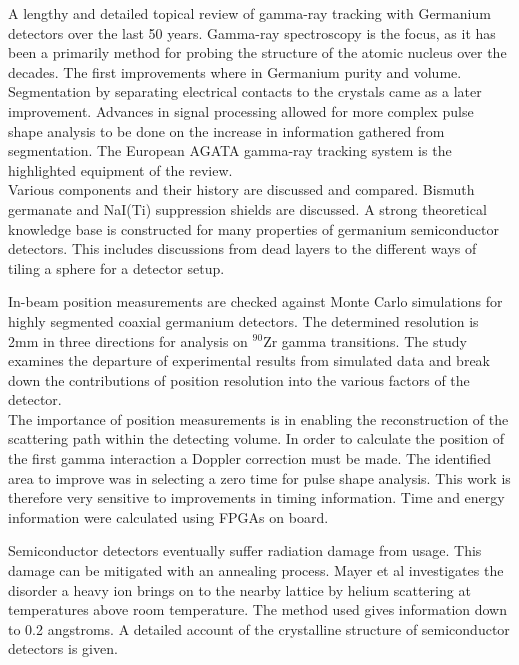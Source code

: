 \documentclass[12pt]{article}
\begin{document}
\begin{doublespacing}
\cite{Eberth2008283}
A lengthy and detailed topical review of gamma-ray tracking with Germanium detectors over the last 50 years.
Gamma-ray spectroscopy is the focus, as it has been a primarily method for probing the structure of the atomic nucleus over the decades.
The first improvements where in Germanium purity and volume.
Segmentation by separating electrical contacts to the crystals came as a later improvement.
Advances in signal processing allowed for more complex pulse shape analysis to be done on the increase in information gathered from segmentation.
The European AGATA gamma-ray tracking system is the highlighted equipment of the review.
\\

Various components and their history are discussed and compared.
Bismuth germanate and NaI(Ti) suppression shields are discussed.
A strong theoretical knowledge base is constructed for many properties of germanium semiconductor detectors.
This includes discussions from dead layers to the different ways of tiling a sphere for a detector setup.


\cite{Descovich2005535}
In-beam position measurements are checked against Monte Carlo simulations for highly segmented coaxial germanium detectors.
The determined resolution is 2mm in three directions for analysis on $^{90}\mbox{Zr}$ gamma transitions.
The study examines the departure of experimental results from simulated data and break down the contributions of position resolution into the various factors of the detector.
\\

The importance of position measurements is in enabling the reconstruction of the scattering path within the detecting volume.
In order to calculate the position of the first gamma interaction a Doppler correction must be made.
The identified area to improve was in selecting a zero time for pulse shape analysis.
This work is therefore very sensitive to improvements in timing information.
Time and energy information were calculated using FPGAs on board.


\cite{Mayer}
Semiconductor detectors eventually suffer radiation damage from usage.
This damage can be mitigated with an annealing process.
Mayer et al investigates the disorder a heavy ion brings on to the nearby lattice by helium scattering at temperatures above room temperature.
The method used gives information down to 0.2 angstroms.
A detailed account of the crystalline structure of semiconductor detectors is given.
\\


\end{doublespacing}
\end{document}

